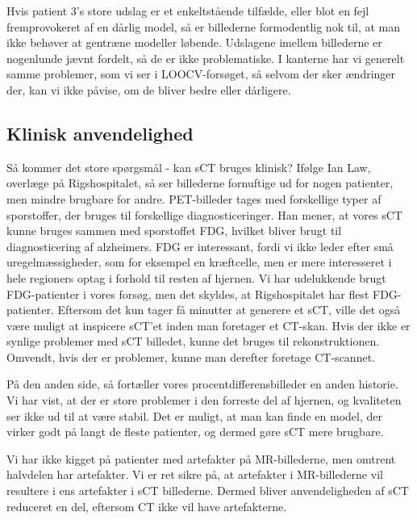 Hvis patient 3’s store udslag er et enkeltstående tilfælde, eller
blot en fejl fremprovokeret af en dårlig model, så er billederne
formodentlig nok til, at man ikke behøver at gentræne modeller
løbende. Udslagene imellem billederne er nogenlunde jævnt fordelt, så
de er ikke problematiske. I kanterne har vi generelt samme problemer,
som vi ser i LOOCV-forsøget, så selvom der sker ændringer der, kan vi
ikke påvise, om de bliver bedre eller dårligere.

\subsection{Klinisk anvendelighed}

Så kommer det store spørgsmål - kan sCT bruges klinisk?  Ifølge Ian Law, overlæge på Rigshospitalet, så ser billederne fornuftige ud for nogen patienter, men mindre brugbare for andre. PET-billeder tages med forskellige typer af sporstoffer, der bruges til forskellige diagnosticeringer. Han mener, at vores sCT kunne bruges sammen med sporstoffet FDG, hvilket bliver brugt til diagnosticering af alzheimers. FDG er interessant, fordi vi ikke leder efter små uregelmæssigheder, som for eksempel en kræftcelle, men er mere interesseret i hele regioners optag i forhold til resten af hjernen. Vi har udelukkende brugt FDG-patienter i vores forsøg, men det skyldes, at Rigshospitalet har flest FDG-patienter. Eftersom det kun tager få minutter at generere et sCT, ville det også være muligt at inspicere sCT’et inden man foretager et CT-skan. Hvis der ikke er synlige problemer med sCT billedet, kunne det bruges til rekonstruktionen. Omvendt, hvis der er problemer, kunne man derefter foretage CT-scannet.

På den anden side, så fortæller vores procentdifferensbilleder en anden historie. Vi har vist, at der er store problemer i den forreste del af hjernen, og kvaliteten ser ikke ud til at være stabil. Det er muligt, at man kan finde en model, der virker godt på langt de fleste patienter, og dermed gøre sCT mere brugbare.

Vi har ikke kigget på patienter med artefakter på MR-billederne, men omtrent halvdelen har artefakter. Vi er ret sikre på, at artefakter i MR-billederne vil resultere i ens artefakter i sCT billederne. Dermed bliver anvendeligheden af sCT reduceret en del, eftersom CT ikke vil have artefakterne.
